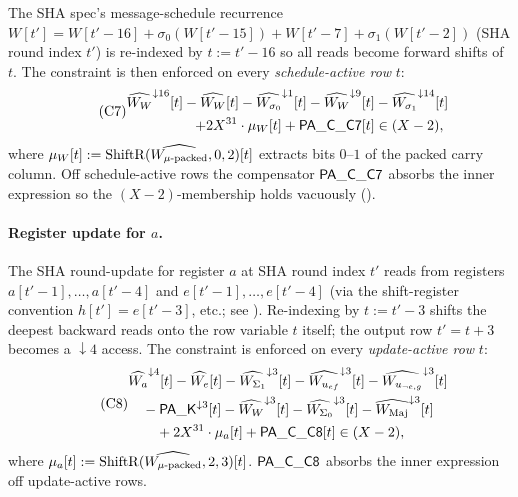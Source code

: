 The SHA spec's message-schedule recurrence
$W[t'] = W[t'-16] + \sigma_0(W[t'-15]) + W[t'-7] + \sigma_1(W[t'-2])$
(SHA round index $t'$) is re-indexed by $t := t' - 16$ so all reads
become forward shifts of $t$. The constraint is then enforced on
every \emph{schedule-active row} $t$:
\begin{equation}\tag{C7}\label{con:c7}
\begin{aligned}
\widehat{W_W}^{\downarrow 16}[t]
  - \widehat{W_W}[t]
  - \widehat{W_{\sigma_0}}^{\downarrow 1}[t]
  - \widehat{W_W}^{\downarrow 9}[t]
  &- \widehat{W_{\sigma_1}}^{\downarrow 14}[t] \\
  + 2X^{31} \cdot \mu_W[t] + \mathsf{PA\_C\_C7}[t] &\in (X-2),
\end{aligned}
\end{equation}
where $\mu_W[t] := \mathrm{ShiftR}(\widehat{W_{\mu\text{-packed}}}, 0, 2)[t]$
extracts bits $0$--$1$ of the packed carry column. Off
schedule-active rows the compensator $\mathsf{PA\_C\_C7}$ absorbs the
inner expression so the $(X-2)$-membership holds vacuously
().

\paragraph{Register update for $a$.}

The SHA round-update for register $a$ at SHA round index $t'$ reads
from registers $a[t'-1], \ldots, a[t'-4]$ and $e[t'-1], \ldots, e[t'-4]$
(via the shift-register convention $h[t'] = e[t'-3]$, etc.; see
). Re-indexing by $t := t' - 3$ shifts the
deepest backward reads onto the row variable $t$ itself; the output
row $t' = t + 3$ becomes a $\downarrow 4$ access. The constraint is
enforced on every \emph{update-active row} $t$:
\begin{equation}\tag{C8}\label{con:c8}
\begin{aligned}
&\widehat{W_a}^{\downarrow 4}[t]
  - \widehat{W_e}[t]
  - \widehat{W_{\Sigma_1}}^{\downarrow 3}[t]
  - \widehat{W_{u_{ef}}}^{\downarrow 3}[t]
  - \widehat{W_{u_{\neg e,g}}}^{\downarrow 3}[t] \\
&\quad - \mathsf{PA\_K}^{\downarrow 3}[t]
  - \widehat{W_W}^{\downarrow 3}[t]
  - \widehat{W_{\Sigma_0}}^{\downarrow 3}[t]
  - \widehat{W_{\operatorname{Maj}}}^{\downarrow 3}[t] \\
&\qquad + 2X^{31} \cdot \mu_a[t] + \mathsf{PA\_C\_C8}[t] \in (X-2),
\end{aligned}
\end{equation}
where $\mu_a[t] := \mathrm{ShiftR}(\widehat{W_{\mu\text{-packed}}}, 2, 3)[t]$.
$\mathsf{PA\_C\_C8}$ absorbs the inner expression off update-active
rows.

